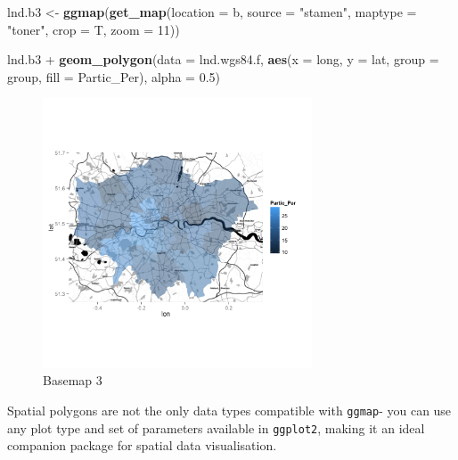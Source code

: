\documentclass[]{article}
\newenvironment{Shaded}{}{}
\newcommand{\KeywordTok}[1]{\textcolor[rgb]{0.00,0.44,0.13}{\textbf{{#1}}}}
\newcommand{\DataTypeTok}[1]{\textcolor[rgb]{0.56,0.13,0.00}{{#1}}}
\newcommand{\DecValTok}[1]{\textcolor[rgb]{0.25,0.63,0.44}{{#1}}}
\newcommand{\FloatTok}[1]{\textcolor[rgb]{0.25,0.63,0.44}{{#1}}}
\newcommand{\StringTok}[1]{\textcolor[rgb]{0.25,0.44,0.63}{{#1}}}
\newcommand{\NormalTok}[1]{{#1}}
\let\Oldincludegraphics\includegraphics
\renewcommand{\includegraphics}[1]{\Oldincludegraphics[width=8cm]{#1}}
\begin{document}
\begin{Shaded}
\begin{Highlighting}[]
\NormalTok{lnd.b3 <- }\KeywordTok{ggmap}\NormalTok{(}\KeywordTok{get_map}\NormalTok{(}\DataTypeTok{location =} \NormalTok{b, }\DataTypeTok{source =} \StringTok{"stamen"}\NormalTok{, }\DataTypeTok{maptype =} \StringTok{"toner"}\NormalTok{, }
    \DataTypeTok{crop =} \NormalTok{T, }\DataTypeTok{zoom =} \DecValTok{11}\NormalTok{))}

\NormalTok{lnd.b3 + }\KeywordTok{geom_polygon}\NormalTok{(}\DataTypeTok{data =} \NormalTok{lnd.wgs84.f, }\KeywordTok{aes}\NormalTok{(}\DataTypeTok{x =} \NormalTok{long, }\DataTypeTok{y =} \NormalTok{lat, }\DataTypeTok{group =} \NormalTok{group, }
    \DataTypeTok{fill =} \NormalTok{Partic_Per), }\DataTypeTok{alpha =} \FloatTok{0.5}\NormalTok{)}
\end{Highlighting}
\end{Shaded}
\begin{figure}[htbp]
\centering
\includegraphics{figure/Basemap_3.png}
\caption{Basemap 3}
\end{figure}

Spatial polygons are not the only data types compatible with
\texttt{ggmap}- you can use any plot type and set of parameters
available in \texttt{ggplot2}, making it an ideal companion package for
spatial data visualisation.
\end{document}
